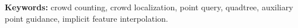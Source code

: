 \documentclass[oneside,a4paper,12pt]{extreport}
\begin{document}
\noindent\textbf{Keywords:} crowd counting, crowd localization, point query, quadtree, auxiliary point guidance, implicit feature interpolation.

\clearpage
{}
{}
\tableofcontents

\clearpage
{}
{}
\listoffigures

\clearpage
{}
{}
\listoftables

\clearpage
{}
\setcounter{page}{1}






\clearpage
{}
{}




\end{document}
